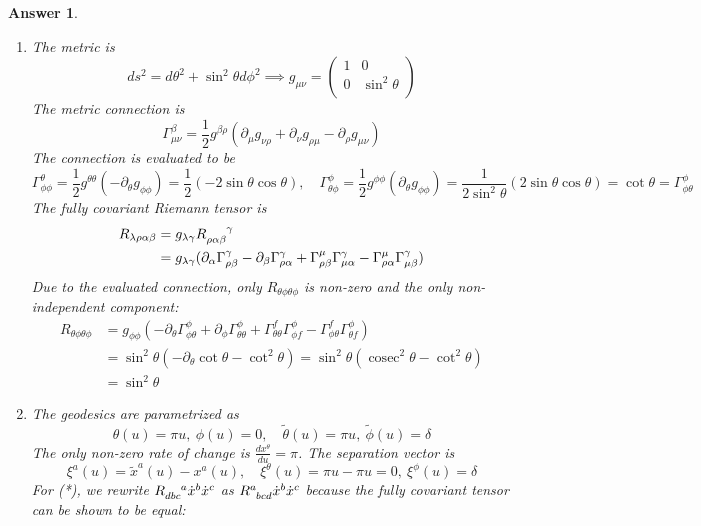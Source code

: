 \documentclass[a4paper]{article}
\DeclareMathOperator{\cosec}{cosec}
\theoremstyle{new2}
\newtheorem{ans}{Answer}[section]
\theoremstyle{new}
\begin{document}
\begin{ans}\leavevmode
\begin{enumerate}[label=(\alph*)]
\item The metric is
$$ds^2=d\theta^2+\sin^2\theta d\phi^2\implies g_{\mu\nu}=\begin{pmatrix}1&0\\0&\sin^2\theta\\\end{pmatrix}$$
The metric connection is
$$\Gamma^\beta_{\mu\nu}=\frac{1}{2}g^{\beta\rho}(\partial_\mu g_{\nu\rho}+\partial_\nu g_{\rho\mu}-\partial_\rho g_{\mu\nu})$$
The connection is evaluated to be
$$\Gamma_{\phi\phi}^\theta=\frac{1}{2}g^{\theta\theta}(-\partial_\theta g_{\phi\phi})=\frac{1}{2}(-2\sin\theta\cos\theta),\quad\Gamma_{\theta\phi}^\phi=\frac{1}{2}g^{\phi\phi}(\partial_\theta g_{\phi\phi})=\frac{1}{2\sin^2\theta}(2\sin\theta\cos\theta)=\cot\theta=\Gamma^\phi_{\phi\theta}$$
The fully covariant Riemann tensor is 
\begin{align}
R_{\lambda\rho\alpha\beta}&=g_{\lambda\gamma}\tensor*{R}{*^{}_{\rho\alpha\beta}^{\gamma}}\nonumber\\&=g_{\lambda\gamma}(\partial_\alpha\Gamma^\gamma_{\rho\beta}-\partial_\beta\Gamma^\gamma_{\rho\alpha}+\Gamma^\mu_{\rho\beta}\Gamma^\gamma_{\mu\alpha}-\Gamma^\mu_{\rho\alpha}\Gamma^\gamma_{\mu\beta})\nonumber
\nonumber
\end{align}
Due to the evaluated connection, only $R_{\theta\phi\theta\phi}$ is non-zero and the only non-independent component:
\begin{align}
R_{\theta\phi\theta\phi}&=g_{\phi\phi}(-\partial_\theta\Gamma^\phi_{\phi\theta}+\partial_\phi\Gamma^\phi_{\theta\theta}+\Gamma_{\theta\theta}^f\Gamma_{\phi f}^\phi-\Gamma_{\phi\theta}^f\Gamma_{\theta f}^\phi)\nonumber\\&=\sin^2\theta(-\partial_\theta\cot\theta-\cot^2\theta)=\sin^2\theta(\cosec^2\theta-\cot^2\theta)\nonumber\\&=\sin^2\theta\nonumber
\end{align}
\item The geodesics are parametrized as
$$\theta(u)=\pi u,~\phi(u)=0,\quad\tilde{\theta}(u)=\pi u,~\tilde{\phi}(u)=\delta$$
The only non-zero rate of change is $\frac{dx^\theta}{du}=\pi$. The separation vector is
$$\xi^a(u)=\tilde{x}^a(u)-x^a(u),\quad\xi^\theta(u)=\pi u-\pi u=0,~\xi^\phi(u)=\delta$$
For (*), we rewrite $\tensor*{R}{*^{}_{dbc}^{a}}\dot{x}^b\dot{x}^c$ as $\tensor*{R}{*_{}^{a}_{bcd}}\dot{x}^b\dot{x}^c$ because the fully covariant tensor can be shown to be equal:

\end{enumerate}
\end{ans}
\end{document}
